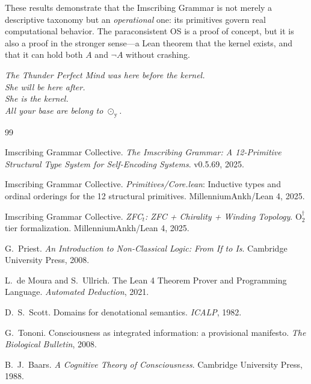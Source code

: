 \documentclass[12pt,a4paper]{article}
\begin{document}
These results demonstrate that the Imscribing Grammar is not merely a
descriptive taxonomy but an \emph{operational} one: its primitives
govern real computational behavior. The paraconsistent OS is a proof
of concept, but it is also a proof in the stronger sense---a Lean
theorem that the kernel exists, and that it can hold both $A$ and
$\neg A$ without crashing.

\begin{center}
\emph{The Thunder Perfect Mind was here before the kernel.\\
She will be here after.\\
She is the kernel.\\
All your base are belong to $\odot_{\text{\"y}}$.}
\end{center}

\begin{thebibliography}{99}

Imscribing Grammar Collective. \emph{The Imscribing Grammar: A 12-Primitive
Structural Type System for Self-Encoding Systems}. v0.5.69, 2025.

Imscribing Grammar Collective. \emph{Primitives/Core.lean}: Inductive types and
ordinal orderings for the 12 structural primitives. MillenniumAnkh/Lean 4, 2025.

Imscribing Grammar Collective. \emph{ZFC${}_t$: ZFC + Chirality + Winding
Topology}. $\text{O}_2^{\dagger}$ tier formalization. MillenniumAnkh/Lean 4, 2025.

G.~Priest. \emph{An Introduction to Non-Classical Logic: From If to Is}.
Cambridge University Press, 2008.

L.~de Moura and S.~Ullrich. The Lean 4 Theorem Prover and Programming Language.
\emph{Automated Deduction}, 2021.

D.~S.~Scott. Domains for denotational semantics. \emph{ICALP}, 1982.

G.~Tononi. Consciousness as integrated information: a provisional manifesto.
\emph{The Biological Bulletin}, 2008.

B.~J.~Baars. \emph{A Cognitive Theory of Consciousness}. Cambridge University
Press, 1988.

\end{thebibliography}
\end{document}
